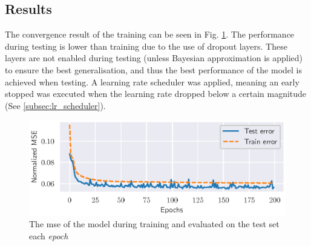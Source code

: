 

\subsection{Results}
The convergence result of the training can be seen in Fig. \ref{fig:training_test_error_channel_estimator}. The performance during testing is lower than training due to the use of dropout layers. These layers are not enabled during testing (unless Bayesian approximation is applied) to ensure the best generalisation, and thus the best performance of the model is achieved when testing. A learning rate scheduler was applied, meaning an early stopped was executed when the learning rate dropped below a certain magnitude (See \ref{subsec:lr_scheduler}).
\begin{figure}
    \centering
    \includegraphics{chapters/part_uplink/figures/results/channel_estimation/Training_test_error.eps}
    \caption{The \gls{mse} of the model during training and evaluated on the test set each \emph{epoch}}
    \label{fig:training_test_error_channel_estimator}
\end{figure}


